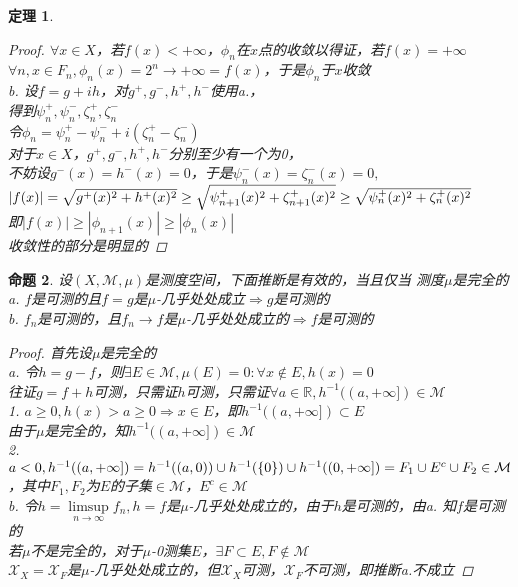 \documentclass[12pt, a4paper, oneside]{ctexbook}
\newtheorem{theorem}{定理}[section]
\newtheorem{proposition}[theorem]{命题}
\begin{document}
\begin{theorem}
\begin{proof}
        $\forall x\in X$，若$f(x)<+\infty$，$\phi_n$在$x$点的收敛以得证，若$f(x)=+\infty$\\
        $\forall n,x\in F_n,\phi_n(x)=2^n\to +\infty=f(x)$，于是$\phi_n$于$x$收敛\\
        b. 设$f=g+ih$，对$g^+,g^-,h^+,h^-$使用a.，\\
        得到$\psi_n^+,\psi_n^-,\zeta_n^+,\zeta_n^-$\\
        令$\phi_n=\psi_n^+-\psi_n^-+i(\zeta_n^+-\zeta_n^-)$\\
        对于$x\in X$，$g^+,g^-,h^+,h^-$分别至少有一个为0，\\
        不妨设$g^-(x)=h^-(x)=0$，于是$\psi_n^-(x)=\zeta_n^-(x)=0,$\\
        $|f(x)|=\sqrt{g^+(x)^2+h^+(x)^2}\geq\sqrt{\psi_{n+1}^+(x)^2+\zeta_{n+1}^+(x)^2}\\
        \geq\sqrt{\psi_{n}^+(x)^2+\zeta_{n}^+(x)^2}$\\
        即$|f(x)|\geq|\phi_{n+1}(x)|\geq|\phi_n(x)|$\\
        收敛性的部分是明显的
    \end{proof}
\end{theorem}
\begin{proposition}
    设$(X,\mathcal{M},\mu)$是测度空间，下面推断是有效的，当且仅当
    测度$\mu$是完全的\\
    a. $f$是可测的且$f=g$是$\mu$-几乎处处成立$\Rightarrow g$是可测的\\
    b. $f_n$是可测的，且$f_n\to f$是$\mu$-几乎处处成立的$\Rightarrow f$是可测的
    \begin{proof}
        首先设$\mu$是完全的\\
        a. 令$h=g-f$，则$\exists E\in \mathcal{M},\mu(E)=0:\forall x\notin E,h(x)=0$\\
        往证$g=f+h$可测，只需证$h$可测，只需证$\forall a\in\mathbb{R},h^{-1}((a,+\infty])\in\mathcal{M}$\\
        1. $a\geq 0,h(x)>a\geq 0\Rightarrow x\in E$，即$h^{-1}((a,+\infty])\subset E$\\
        由于$\mu$是完全的，知$h^{-1}((a,+\infty])\in\mathcal{M}$\\
        2. $a<0,h^{-1}((a,+\infty])=h^{-1}((a,0))\cup h^{-1}(\left\{0\right\})\cup h^{-1}((0,+\infty])\\
        =F_1\cup E^c\cup F_2\in\mathcal{M}$，其中$F_1,F_2$为$E$的子集$\in\mathcal{M}$，$E^c\in\mathcal{M}$\\
        b. 令$h=\underset{n\to\infty}{\limsup}f_n,h=f$是$\mu$-几乎处处成立的，由于$h$是可测的，由a. 
        知$f$是可测的\\
        若$\mu$不是完全的，对于$\mu$-0测集$E$，$\exists F\subset E,F\notin\mathcal{M}$\\
        $\mathcal{X}_X=\mathcal{X}_F$是$\mu$-几乎处处成立的，但$\mathcal{X}_X$可测，$\mathcal{X}_F$不可测，即推断a.不成立
    \end{proof}
\end{proposition}
\end{document}
